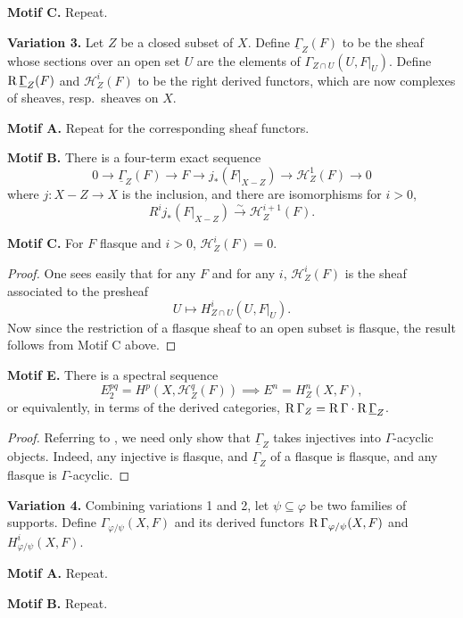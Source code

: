 \medskip\noindent\textbf{Motif C.} Repeat.

\medskip\noindent\textbf{Variation 3.}
Let $Z$ be a closed subset of $X$. Define $\underline{\Gamma}_Z(F)$ to be the sheaf whose sections over an open set $U$ are the elements of $\Gamma_{Z\cap U}(U,F|_U)$. Define $\operatorname{R}\underline{\Gamma}_Z(F)$ and $\mathcal{H}_Z^i(F)$ to be the right derived functors, which are now complexes of sheaves, resp.\ sheaves on $X$.

\medskip\noindent\textbf{Motif A.} Repeat for the corresponding sheaf functors.

\medskip\noindent\textbf{Motif B.} There is a four-term exact sequence
\[
0\longrightarrow \underline{\Gamma}_Z(F)\longrightarrow F\longrightarrow j_*(F|_{X-Z})\longrightarrow \mathcal{H}^1_Z(F)\longrightarrow 0
\]
where $j\colon X-Z\to X$ is the inclusion, and there are isomorphisms for $i>0$,
\[
R^i j_*(F|_{X-Z}) \xrightarrow{\sim} \mathcal{H}_Z^{i+1}(F).
\]

\medskip\noindent\textbf{Motif C.} For $F$ flasque and $i>0$, $\mathcal{H}_Z^{i}(F)=0$.
\begin{proof}
One sees easily that for any $F$ and for any $i$, $\mathcal{H}^{i}_Z(F)$ is the sheaf associated to the presheaf
\[
U\longmapsto H_{Z\cap U}^{i}(U,F|_U).
\]
Now since the restriction of a flasque sheaf to an open subset is flasque, the result follows from Motif C above.
\end{proof}

\medskip\noindent\textbf{Motif E.} There is a spectral sequence
\[
E_2^{pq}=H^p(X, \mathcal{H}_Z^q(F))\implies E^n=H_Z^n(X,F),
\]
or equivalently, in terms of the derived categories, $\operatorname{R}\Gamma_Z = \operatorname{R}\Gamma\cdot \operatorname{R}\underline{\Gamma}_Z$.
\begin{proof}
Referring to , we need only show that $\underline{\Gamma}_Z$ takes injectives into $\Gamma$-acyclic objects. Indeed, any injective is flasque, and $\underline{\Gamma}_Z$ of a flasque is flasque, and any flasque is $\Gamma$-acyclic.
\end{proof}

\medskip\noindent\textbf{Variation 4.}
Combining variations 1 and 2, let $\psi\subseteq\varphi$ be two families of supports. Define $\Gamma_{\varphi/\psi}(X,F)$ and its derived functors $\operatorname{R}\Gamma_{\varphi/\psi}(X,F)$ and $H^i_{\varphi/\psi}(X,F)$.

\medskip\noindent\textbf{Motif A.} Repeat.

\medskip\noindent\textbf{Motif B.} Repeat.

